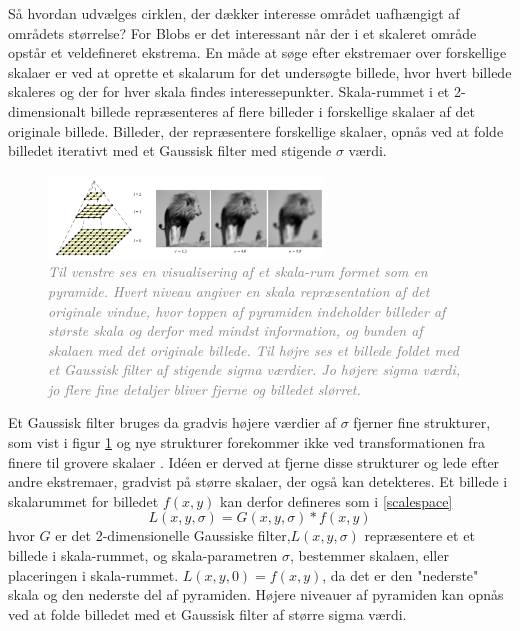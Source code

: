        \vspace{-2.5em}
\noindent
Så hvordan udvælges cirklen, der dækker interesse området uafhængigt af områdets størrelse?  For Blobs er det interessant når der i et skaleret område opstår et veldefineret ekstrema. En måde at søge efter ekstremaer over forskellige skalaer er ved at oprette et skalarum for det undersøgte billede, hvor hvert billede skaleres og der for hver skala findes interessepunkter. Skala-rummet i et 2-dimensionalt billede repræsenteres af flere billeder i forskellige skalaer af det originale billede. Billeder, der repræsentere forskellige skalaer, opnås ved at folde billedet iterativt med et Gaussisk filter med stigende $\sigma$ værdi. 
\begin{figure}[H]
    \centering
    \includegraphics[width=0.65\textwidth]{fig/24.png}
    \vspace{-0.5em}   
    \begin{center}
    \caption{\textcolor{gray}{\footnotesize \textit{
Til venstre ses en visualisering af et skala-rum formet som en pyramide. Hvert niveau angiver en skala repræsentation af det originale vindue, hvor toppen af pyramiden indeholder billeder af største skala og derfor med mindst information, og bunden af skalaen med det originale billede. Til højre ses et billede foldet med et Gaussisk filter af stigende sigma værdier. Jo højere sigma værdi, jo flere fine detaljer bliver fjerne og billedet slørret.
    }}}
    \label{fig:mona}
     \end{center}
  \end{figure}
       \vspace{-2.5em}
\noindent
Et Gaussisk filter bruges da gradvis højere værdier af $\sigma$ fjerner fine strukturer, som vist i figur \ref{fig:mona} og nye strukturer forekommer ikke ved transformationen fra finere til grovere skalaer \cite{lindenscale}. Idéen er derved at fjerne disse strukturer og lede efter  andre ekstremaer, gradvist på større skalaer, der også kan detekteres.
Et billede i skalarummet for billedet $f(x,y)$ kan derfor defineres som i \eqref{scalespace}
\begin{equation}
L(x,y,\sigma) = G(x,y,\sigma)\ast f(x,y)
\label{scalespace}
\end{equation}
hvor $G$ er det 2-dimensionelle Gaussiske filter,$L(x,y,\sigma)$ repræsentere et et billede i skala-rummet, og skala-parametren $\sigma$, bestemmer skalaen, eller placeringen i skala-rummet. $L(x,y,0) = f(x,y)$, da det er den "nederste" skala og den nederste del af pyramiden. Højere niveauer af pyramiden kan opnås ved at folde billedet med et Gaussisk filter af større sigma værdi.

